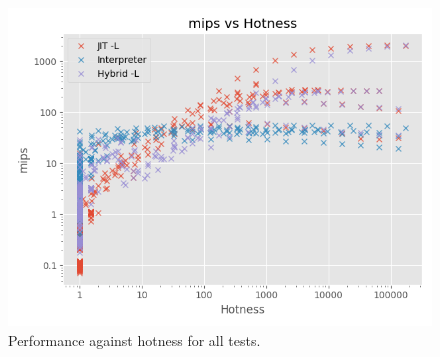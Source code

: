 \begin{figure}[H]
    \centering
    \includegraphics[scale=0.75]{output/graphs/scatter/emulators/hotness.png}
    \caption{Performance against hotness for all tests.}
    \label{figure:hotness}
\end{figure}







